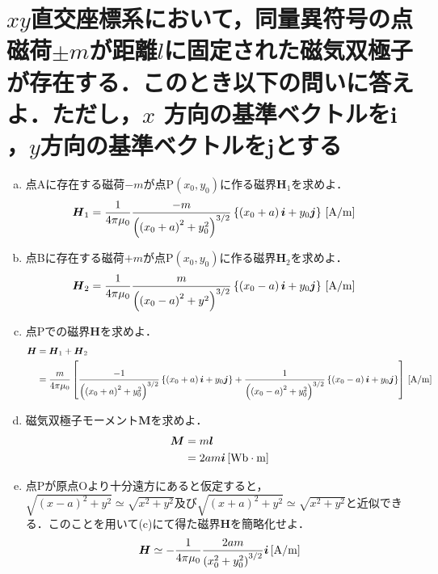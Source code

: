 \documentclass[dvipdfmx]{ujarticle}
\begin{document}
\section{$xy$直交座標系において，同量異符号の点磁荷$\pm m$が距離$l$に固定された磁気双極子が存在する．このとき以下の問いに答えよ．ただし，$x$ 方向の基準ベクトルを$\boldsymbol{i}$，$y$方向の基準ベクトルを$\boldsymbol{j}$とする}
\begin{enumerate}[(a)]
	\item 点Aに存在する磁荷$-m$が点P$(x_0,y_0)$に作る磁界$\boldsymbol{H}_{1}$を求めよ．
	\begin{align*}
		\boldsymbol{H}_{1}&=\frac{1}{4\pi \mu_{0}}\frac{-m}{\left(\left(x_0+a\right)^{2}+y_{0}^{2}\right)^{3/2}} \left\{ \left(x_{0}+a\right)\boldsymbol{i}+y_{0}\boldsymbol{j}\right\}\,[\rm{A/m}]
	\end{align*}
	\item 点Bに存在する磁荷$+m$が点P$(x_0,y_0)$に作る磁界$\boldsymbol{H}_{2}$を求めよ．
	\begin{align*}
		\boldsymbol{H}_{2}&=\frac{1}{4\pi \mu_{0}}\frac{m}{\left(\left(x_{0}-a\right)^{2}+y^{2}\right)^{3/2}} \left\{ \left(x_{0}-a\right)\boldsymbol{i}+y_{0}\boldsymbol{j}\right\}\,[\rm{A/m}]
	\end{align*}
	\item 点Pでの磁界$\boldsymbol{H}$を求めよ．
	\begin{align*}
		\boldsymbol{H}&=\boldsymbol{H}_{1}+\boldsymbol{H}_{2}\\
		&=\frac{m}{4\pi \mu_{0}}\left[\frac{-1}{\left(\left(x_{0}+a\right)^{2}+y_{0}^{2}\right)^{3/2}} \left\{ \left(x_{0}+a\right)\boldsymbol{i}+y_{0}\boldsymbol{j}\right\}+\frac{1}{\left(\left(x_{0}-a\right)^{2}+y_{0}^{2}\right)^{3/2}} \left\{ \left(x_{0}-a\right)\boldsymbol{i}+y_{0}\boldsymbol{j}\right\}\right]\,[\rm{A/m}]
	\end{align*}
	\item 磁気双極子モーメント$\boldsymbol{M}$を求めよ．
	\begin{align*}
		\boldsymbol{M}&=m\boldsymbol{l}\\
		&=2am\boldsymbol{i}\,[\rm{Wb\cdot m}]
	\end{align*}
	\item 点Pが原点Oより十分遠方にあると仮定すると，$\sqrt{(x-a)^{2}+y^{2}}\simeq \sqrt{x^{2}+y^{2}}$及び$\sqrt{(x+a)^{2}+y^{2}}\simeq \sqrt{x^{2}+y^{2}}$と近似できる．このことを用いて(c)にて得た磁界$\boldsymbol{H}$を簡略化せよ．
	\begin{align*}
		\boldsymbol{H}&\simeq -\frac{1}{4\pi \mu_{0}}\frac{2am}{\left(x_{0}^{2}+y_{0}^{2}\right)^{3/2}} \boldsymbol{i}\,[\rm{A/m}]\\

\end{align*}
\end{enumerate}
\end{document}
